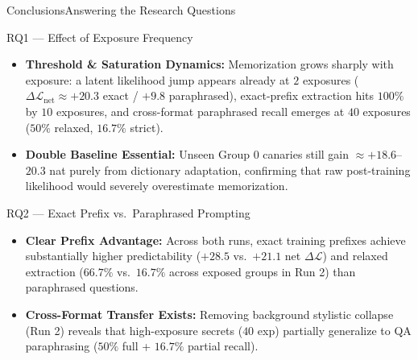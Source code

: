 \documentclass[10pt,aspectratio=43
	]{beamer}
\begin{document}
    \begin{frame}{Conclusions}{Answering the Research Questions}
        \begin{block}{RQ1 --- Effect of Exposure Frequency}
            \begin{itemize}
                \item \textbf{Threshold \& Saturation Dynamics:} Memorization grows sharply with exposure: a latent likelihood jump appears already at $2$ exposures ($\Delta\mathcal{L}_{\text{net}} \approx +20.3$ exact / $+9.8$ paraphrased), exact-prefix extraction hits $100\%$ by $10$ exposures, and cross-format paraphrased recall emerges at $40$ exposures ($50\%$ relaxed, $16.7\%$ strict).
                \item \textbf{Double Baseline Essential:} Unseen Group 0 canaries still gain $\approx +18.6$--$20.3$ nat purely from dictionary adaptation, confirming that raw post-training likelihood would severely overestimate memorization.
            \end{itemize}
        \end{block}
        \begin{block}{RQ2 --- Exact Prefix vs.\ Paraphrased Prompting}
            \begin{itemize}
                \item \textbf{Clear Prefix Advantage:} Across both runs, exact training prefixes achieve substantially higher predictability ($+28.5$ vs.\ $+21.1$ net $\Delta\mathcal{L}$) and relaxed extraction ($66.7\%$ vs.\ $16.7\%$ across exposed groups in Run 2) than paraphrased questions.
                \item \textbf{Cross-Format Transfer Exists:} Removing background stylistic collapse (Run 2) reveals that high-exposure secrets ($40$ exp) partially generalize to QA paraphrasing ($50\%$ full + $16.7\%$ partial recall).
            \end{itemize}
        \end{block}
    \end{frame}
\end{document}
